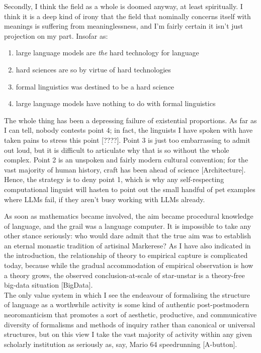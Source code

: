 Secondly, I think the field as a whole is doomed anyway, at least spiritually. I think it is a deep kind of irony that the field that nominally concerns itself with meanings is suffering from meaninglessness, and I'm fairly certain it isn't just projection on my part. Insofar as:
\begin{enumerate}
\item large language models are \emph{the} hard technology for language
\item hard sciences are so by virtue of hard technologies
\item formal linguistics was destined to be a hard science
\item large language models have nothing to do with formal linguistics
\end{enumerate}
The whole thing has been a depressing failure of existential proportions. As far as I can tell, nobody contests point 4; in fact, the linguists I have spoken with have taken pains to stress this point [????]. Point 3 is just too embarrassing to admit out loud, but it is difficult to articulate why that is so without the whole complex. Point 2 is an unspoken and fairly modern cultural convention; for the vast majority of human history, craft has been ahead of science [Architecture]. Hence, the strategy is to deny point 1, which is why any self-respecting computational linguist will hasten to point out the small handful of pet examples where LLMs fail, if they aren't busy working with LLMs already.

As soon as mathematics became involved, the aim became procedural knowledge of language, and the grail was a language computer. It is impossible to take any other stance seriously: who would dare admit that the true aim was to establish an eternal monastic tradition of artisinal Markerese? As I have also indicated in the introduction, the relationship of theory to empirical capture is complicated today, because while the gradual accommodation of empirical observation is how a theory grows, the observed conclusion-at-scale of star-unstar is a theory-free big-data situation [BigData]. \\



The only value system in which I see the endeavour of formalising the structure of language as a worthwhile activity is some kind of authentic post-postmodern neoromanticism that promotes a sort of aesthetic, productive, and communicative diversity of formalisms and methods of inquiry rather than canonical or universal structures, but on this view I take the vast majority of activity within any given scholarly institution as seriously as, say, Mario 64 speedrunning [A-button]. 